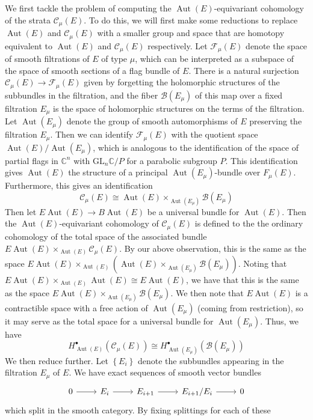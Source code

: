 \documentclass[psamsfonts, 12pt]{amsart}
\theoremstyle{definition}
\theoremstyle{remark}
\newcommand{\C}{\mathbb{C}}
\newcommand{\GL}{\mathrm{GL}}
\newcommand{\set}[1]{\left\lbrace #1 \right\rbrace}
\DeclareMathOperator{\Aut}{Aut}
\begin{document}
We first tackle the problem of computing the $\Aut(E)$-equivariant cohomology of
the strata $\mathscr{C}_\mu(E)$. To do this, we will first make some reductions
to replace $\Aut(E)$ and $\mathscr{C}_\mu(E)$ with a smaller group and space
that are homotopy equivalent to $\Aut(E)$ and $\mathscr{C}_\mu(E)$ respectively.
Let $\mathscr{F}_\mu(E)$ denote the space of smooth filtrations of $E$ of
type $\mu$, which can be interpreted as a subspace of the space of smooth
sections of a flag bundle of $E$. There is a natural surjection
$\mathscr{C}_\mu(E) \to \mathscr{F}_\mu(E)$ given by forgetting the holomorphic
structures of the subbundles in the filtration, and the fiber $\mathscr{B}(E_\mu)$
of this map over a fixed filtration $E_\mu$ is the space of holomorphic structures
on the terms of the filtration. Let $\Aut(E_\mu)$ denote the group of smooth
automorphisms of $E$ preserving the filtration $E_\mu$. Then we can identify
$\mathscr{F}_\mu(E)$ with the quotient space $\Aut(E)/\Aut(E_\mu)$, which is
analogous to the identification of the space of partial flags in $\C^n$ with
$\GL_n\C/P$ for a parabolic subgroup $P$. This identification gives $\Aut(E)$ the
structure of a principal $\Aut(E_\mu)$-bundle over $F_\mu(E)$. Furthermore,
this gives an identification
\[
\mathscr{C}_\mu(E) \cong \Aut(E) \times_{\Aut(E_\mu)} \mathscr{B}(E_\mu)
\]
Then let $E\Aut(E) \to B\Aut(E)$ be a universal bundle for $\Aut(E)$. Then
the $\Aut(E)$-equivariant cohomology of $\mathscr{C}_\mu(E)$ is defined to the
the ordinary cohomology of the total space of the associated bundle
$E\Aut(E) \times_{\Aut(E)} \mathscr{C}_\mu(E)$. By our above observation, this
is the same as the space
$E\Aut(E) \times_{\Aut(E)} (\Aut(E) \times_{\Aut(E_\mu)} \mathscr{B}(E_\mu))$.
Noting that $E\Aut(E) \times_{\Aut(E)} \Aut(E) \cong E\Aut(E)$, we have that
this is the same as the space $E\Aut(E) \times_{\Aut(E_\mu)} \mathscr{B}(E_\mu)$.
We then note that $E\Aut(E)$ is a contractible space with a free action of
$\Aut(E_\mu)$ (coming from restriction), so it may serve as the total space
for a universal bundle for $\Aut(E_\mu)$. Thus, we have
\[
H^\bullet_{\Aut(E)}(\mathscr{C}_\mu(E)) \cong
H^\bullet_{\Aut(E_\mu)}(\mathscr{B}(E_\mu))
\]
We then reduce further. Let $\set{E_i}$ denote the subbundles appearing in
the filtration $E_\mu$ of $E$. We have exact sequences of smooth vector bundles
\[\begin{tikzcd}
0 \ar[r] & E_i \ar[r] & E_{i+1} \ar[r] & E_{i+1}/E_i \ar[r] & 0
\end{tikzcd}\]
which split in the smooth category. By fixing splittings for each of these
\end{document}
